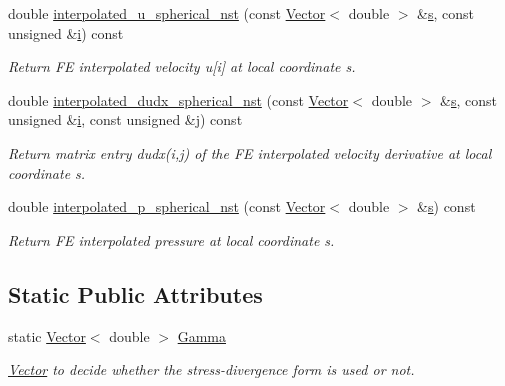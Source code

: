 \begin{DoxyCompactItemize}
double \hyperlink{classoomph_1_1SphericalNavierStokesEquations_ae728a60ea2c5af4e3578e0fe9f010aff}{interpolated\+\_\+u\+\_\+spherical\+\_\+nst} (const \hyperlink{classoomph_1_1Vector}{Vector}$<$ double $>$ \&\hyperlink{cfortran_8h_ab7123126e4885ef647dd9c6e3807a21c}{s}, const unsigned \&\hyperlink{cfortran_8h_adb50e893b86b3e55e751a42eab3cba82}{i}) const
\begin{DoxyCompactList}\small\item\em Return FE interpolated velocity u\mbox{[}i\mbox{]} at local coordinate s. \end{DoxyCompactList}\item 
double \hyperlink{classoomph_1_1SphericalNavierStokesEquations_a103fc06bfd3cad9f5511686e5e5d1ce9}{interpolated\+\_\+dudx\+\_\+spherical\+\_\+nst} (const \hyperlink{classoomph_1_1Vector}{Vector}$<$ double $>$ \&\hyperlink{cfortran_8h_ab7123126e4885ef647dd9c6e3807a21c}{s}, const unsigned \&\hyperlink{cfortran_8h_adb50e893b86b3e55e751a42eab3cba82}{i}, const unsigned \&j) const
\begin{DoxyCompactList}\small\item\em Return matrix entry dudx(i,j) of the FE interpolated velocity derivative at local coordinate s. \end{DoxyCompactList}\item 
double \hyperlink{classoomph_1_1SphericalNavierStokesEquations_a93c638dbbf7fdcb0202514766e71bc73}{interpolated\+\_\+p\+\_\+spherical\+\_\+nst} (const \hyperlink{classoomph_1_1Vector}{Vector}$<$ double $>$ \&\hyperlink{cfortran_8h_ab7123126e4885ef647dd9c6e3807a21c}{s}) const
\begin{DoxyCompactList}\small\item\em Return FE interpolated pressure at local coordinate s. \end{DoxyCompactList}\end{DoxyCompactItemize}
\subsection*{Static Public Attributes}
\begin{DoxyCompactItemize}
\item 
static \hyperlink{classoomph_1_1Vector}{Vector}$<$ double $>$ \hyperlink{classoomph_1_1SphericalNavierStokesEquations_a46db5472cddbf25175670ef6298cbe51}{Gamma}
\begin{DoxyCompactList}\small\item\em \hyperlink{classoomph_1_1Vector}{Vector} to decide whether the stress-\/divergence form is used or not. \end{DoxyCompactList}\end{DoxyCompactItemize}
